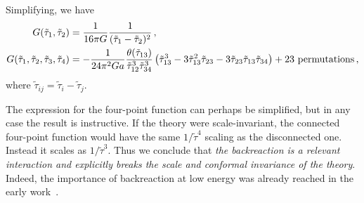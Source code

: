 \documentclass[12pt]{article}
\begin{document}
Simplifying, we have 
\begin{align}
G(\tilde\tau_1,\tilde\tau_{2}) &= {1 \over 16 \pi G} \frac{ 1}{(\tilde\tau_1 - \tilde\tau_2)^2} \,, \nonumber\\
G(\tilde\tau_1,\tilde\tau_{2},\tilde\tau_3,\tilde\tau_{4}) &= - {1\over 24\pi^2 G a} \frac{\theta(\tilde\tau_{13})}{\tilde\tau_{12}^3\tilde\tau_{34}^3}\left(\tilde\tau_{13}^3 - 3\tilde\tau_{13}^2 \tilde\tau_{23} - 3 \tilde\tau_{23}\tilde\tau_{13}\tilde\tau_{34}\right) + {\rm 23\ permutations}\,,
\end{align}
where $\tilde\tau_{ij} = \tilde\tau_i - \tilde\tau_j$.

The expression for the four-point function can perhaps be simplified, but in any case the result is instructive.  If the theory were scale-invariant, the connected four-point function would have the same $1/\tilde\tau^4$ scaling as the disconnected one.  Instead it scales as $1/\tilde\tau^{3}$.  Thus we conclude that {\it the backreaction is a relevant interaction and explicitly breaks the scale and conformal invariance of the theory}.  Indeed, the importance of backreaction at low energy was already reached in the early work~\cite{Preskill:1991tb}.
\end{document}
